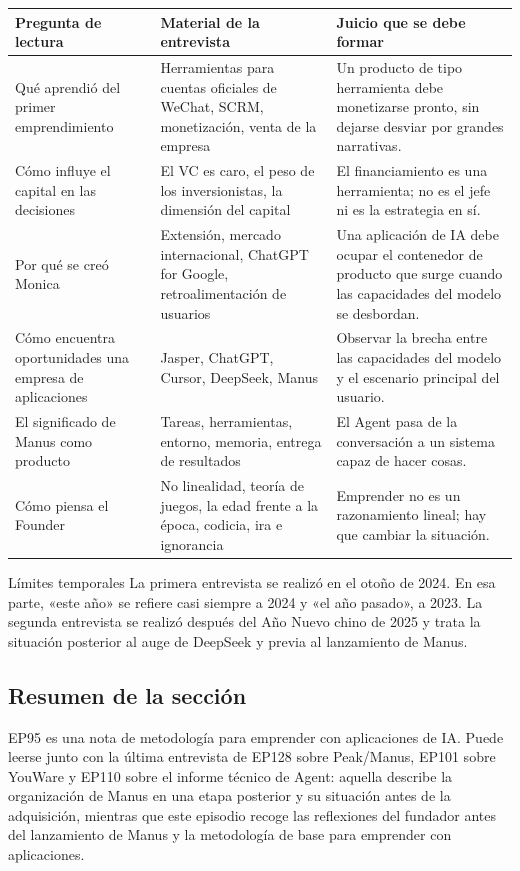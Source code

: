 \noindent\begin{tabularx}{\textwidth}{p{}p{}X}
\toprule
Pregunta de lectura & Material de la entrevista & Juicio que se debe formar \\
\midrule
Qué aprendió del primer emprendimiento & Herramientas para cuentas oficiales de WeChat, SCRM, monetización, venta de la empresa & Un producto de tipo herramienta debe monetizarse pronto, sin dejarse desviar por grandes narrativas. \\
Cómo influye el capital en las decisiones & El VC es caro, el peso de los inversionistas, la dimensión del capital & El financiamiento es una herramienta; no es el jefe ni es la estrategia en sí. \\
Por qué se creó Monica & Extensión, mercado internacional, ChatGPT for Google, retroalimentación de usuarios & Una aplicación de IA debe ocupar el contenedor de producto que surge cuando las capacidades del modelo se desbordan. \\
Cómo encuentra oportunidades una empresa de aplicaciones & Jasper, ChatGPT, Cursor, DeepSeek, Manus & Observar la brecha entre las capacidades del modelo y el escenario principal del usuario. \\
El significado de Manus como producto & Tareas, herramientas, entorno, memoria, entrega de resultados & El Agent pasa de la conversación a un sistema capaz de hacer cosas. \\
Cómo piensa el Founder & No linealidad, teoría de juegos, la edad frente a la época, codicia, ira e ignorancia & Emprender no es un razonamiento lineal; hay que cambiar la situación. \\
\bottomrule
\end{tabularx}

\begin{warningbox}{Límites temporales}
La primera entrevista se realizó en el otoño de 2024. En esa parte, «este año» se refiere casi siempre a 2024 y «el año pasado», a 2023. La segunda entrevista se realizó después del Año Nuevo chino de 2025 y trata la situación posterior al auge de DeepSeek y previa al lanzamiento de Manus.
\end{warningbox}

\subsection{Resumen de la sección}

EP95 es una nota de metodología para emprender con aplicaciones de IA. Puede leerse junto con la última entrevista de EP128 sobre Peak/Manus, EP101 sobre YouWare y EP110 sobre el informe técnico de Agent: aquella describe la organización de Manus en una etapa posterior y su situación antes de la adquisición, mientras que este episodio recoge las reflexiones del fundador antes del lanzamiento de Manus y la metodología de base para emprender con aplicaciones.
